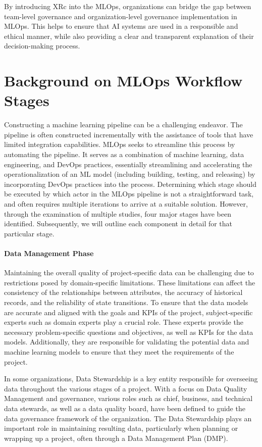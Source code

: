 \documentclass[conference]{IEEEtran}
\begin{document}
By introducing XRc into the MLOps, organizations can bridge the gap between team-level governance and organization-level governance implementation in MLOps. This helps to ensure that AI systems are used in a responsible and ethical manner, while also providing a clear and transparent explanation of their decision-making process.

\section{Background on MLOps Workflow Stages}
Constructing a machine learning pipeline can be a challenging endeavor. The pipeline is often constructed incrementally with the assistance of tools that have limited integration capabilities. MLOps seeks to streamline this process by automating the pipeline. It serves as a combination of machine learning, data engineering, and DevOps practices, essentially streamlining and accelerating the operationalization of an ML model (including building, testing, and releasing) by incorporating DevOps practices into the process. Determining which stage should be executed by which actor in the MLOps pipeline is not a straightforward task, and often requires multiple iterations to arrive at a suitable solution. However, through the examination of multiple studies, four major stages have been identified. Subsequently, we will outline each component in detail for that particular stage.
\paragraph{Data Management Phase} Maintaining the overall quality of project-specific data can be challenging due to restrictions posed by domain-specific limitations. These limitations can affect the consistency of the relationships between attributes, the accuracy of historical records, and the reliability of state transitions. To ensure that the data models are accurate and aligned with the goals and KPIs of the project, subject-specific experts such as domain experts play a crucial role. These experts provide the necessary problem-specific questions and objectives, as well as KPIs for the data models. Additionally, they are responsible for validating the potential data and machine learning models to ensure that they meet the requirements of the project.

In some organizations, Data Stewardship is a key entity responsible for overseeing data throughout the various stages of a project. With a focus on Data Quality Management and governance, various roles such as chief, business, and technical data stewards, as well as a data quality board, have been defined to guide the data governance framework of the organization. The Data Stewardship plays an important role in maintaining resulting data, particularly when planning or wrapping up a project, often through a Data Management Plan (DMP).
\end{document}
